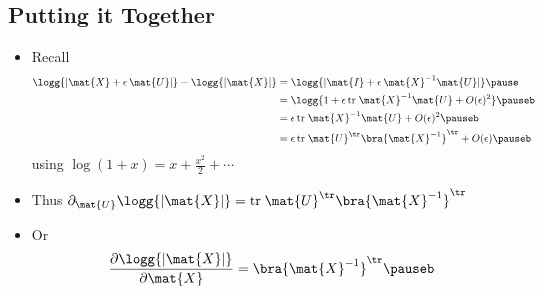 
\begin{slide}
\section[-2]{Putting it Together}

\begin{PauseHighLight}
  \begin{itemize}
  \item Recall
    \begin{align*}
      \logg{|\mat{X}+\epsilon\,\mat{U}|} - \logg{|\mat{X}|}
      &= \logg{|\mat{I} + \epsilon\,\mat{X}^{-1}\mat{U}|}\pause \\
      &= \logg{1 + \epsilon \, \mathrm{tr}\; \mat{X}^{-1}\mat{U}+
        O(\epsilon)^2}\pauseb\\
        &=  \epsilon \, \mathrm{tr}\; \mat{X}^{-1}\mat{U}+
        O(\epsilon)^2\pauseb\\
        &= \epsilon \, \mathrm{tr}\; \mat{U}^\tr \bra{\mat{X}^{-1}}^\tr+ O(\epsilon)\pauseb
    \end{align*}
    using $\log(1+x) = x + \tfrac{x^2}{2} +
    \cdots$\pause {}
    \item Thus $\partial_{\mat{U}} \logg{|\mat{X}|} = \mathrm{tr}\;
      \mat{U}^\tr \bra{\mat{X}^{-1}}^\tr$\pauseb
    \item Or
      \begin{align*}
        \frac{\partial \logg{|\mat{X}|}}{\partial \mat{X}} =  \bra{\mat{X}^{-1}}^\tr\pauseb
      \end{align*}

  \end{itemize}
\end{PauseHighLight}

\end{slide}

